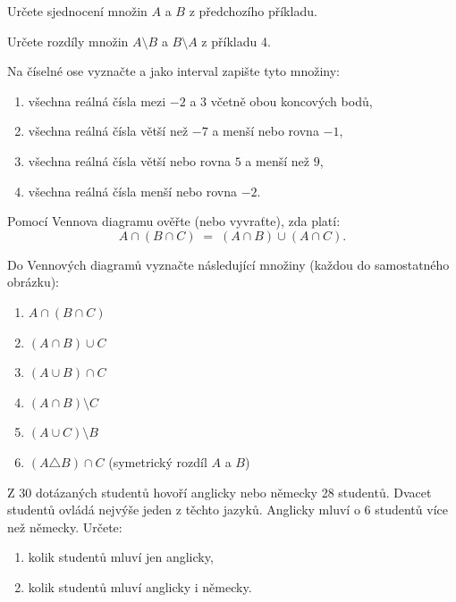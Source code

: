 \documentclass[12pt,a4paper]{article}
\begin{document}
\begin{exercise}
Určete sjednocení množin $A$ a $B$ z předchozího příkladu.
\end{exercise}


\begin{exercise}
Určete rozdíly množin $A \setminus B$ a $B \setminus A$ z příkladu 4.
\end{exercise}


\setcounter{section}{3}
\newpage
\begin{exercise}
Na číselné ose vyznačte a jako interval zapište tyto množiny:  

\begin{enumerate}[label=\alph*)]
    \item všechna reálná čísla mezi $-2$ a $3$ včetně obou koncových bodů,  
    \item všechna reálná čísla větší než $-7$ a menší nebo rovna $-1$,  
    \item všechna reálná čísla větší nebo rovna $5$ a menší než $9$,  
    \item všechna reálná čísla menší nebo rovna $-2$.  
\end{enumerate}
\end{exercise}


\setcounter{section}{4}
\begin{exercise}
Pomocí Vennova diagramu ověřte (nebo vyvraťte), zda platí:
\[
A \cap (B \cap C) \;=\; (A \cap B) \cup (A \cap C).
\]
\end{exercise}


\begin{exercise}
Do Vennových diagramů vyznačte následující množiny (každou do samostatného obrázku):
\begin{enumerate}[label=\alph*)]
    \item $A \cap (B \cap C)$
    \item $(A \cap B) \cup C$
    \item $(A \cup B) \cap C$
    \item $(A \cap B) \setminus C$
    \item $(A \cup C) \setminus B$
    \item $(A \triangle B) \cap C$ \quad (symetrický rozdíl $A$ a $B$)
\end{enumerate}
\end{exercise}


\setcounter{section}{5}
\begin{exercise}
Z 30 dotázaných studentů hovoří anglicky nebo německy 28 studentů.
Dvacet studentů ovládá nejvýše jeden z těchto jazyků.
Anglicky mluví o 6 studentů více než německy.
Určete:
\begin{enumerate}[label=\alph*)]
    \item kolik studentů mluví jen anglicky,
    \item kolik studentů mluví anglicky i německy.
\end{enumerate}
\end{exercise}
\end{document}
